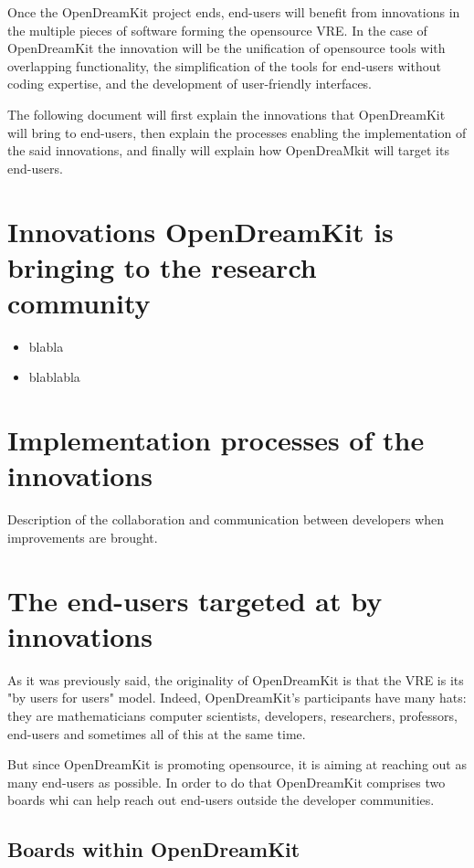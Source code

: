 \documentclass{deliverablereport}
\begin{document}
Once the OpenDreamKit project ends, end-users will benefit from innovations in the multiple pieces of software forming the opensource VRE. In the case of OpenDreamKit the innovation will be the unification of opensource tools with overlapping functionality, the simplification of the tools for end-users without coding expertise, and the development of user-friendly interfaces.

The following document will first explain the innovations that OpenDreamKit will bring to end-users, then explain the processes enabling the implementation of the said innovations, and finally will explain how OpenDreaMkit will target its end-users.


\section{Innovations OpenDreamKit is bringing to the research community}

\begin{itemize}
\item{blabla}
\item{blablabla}
\end{itemize}


\section{Implementation processes of the innovations}

Description of the collaboration and communication between developers when improvements are brought.



\section{The end-users targeted at by innovations}

As it was previously said, the originality of OpenDreamKit is that the VRE is its "by users for users" model. Indeed, OpenDreamKit's participants have many hats: they are mathematicians computer scientists, developers, researchers, professors, end-users and sometimes all of this at the same time. 

But since OpenDreamKit is promoting opensource, it is aiming at reaching out as many end-users as possible. In order to do that OpenDreamKit comprises two boards whi can help reach out end-users outside the developer communities.

\subsection{Boards within OpenDreamKit}
\end{document}
